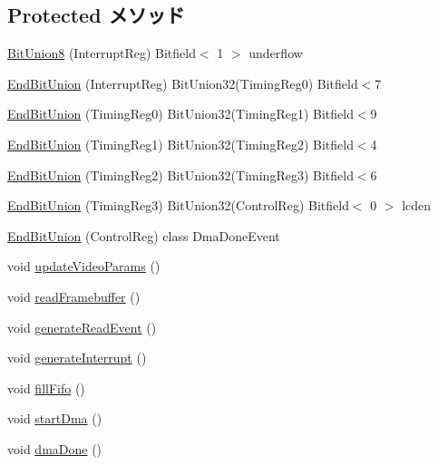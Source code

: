 \subsection*{Protected メソッド}
\begin{DoxyCompactItemize}
\item 
\hyperlink{classPl111_a6314622cb4d926c2f90ff68d0cbbf17c}{BitUnion8} (InterruptReg) Bitfield$<$ 1 $>$ underflow
\item 
\hyperlink{classPl111_a28c76606944b50cce3f43516e6178ea5}{EndBitUnion} (InterruptReg) BitUnion32(TimingReg0) Bitfield$<$7
\item 
\hyperlink{classPl111_ab87617f01d73eb885bbcaf6ae70a63ce}{EndBitUnion} (TimingReg0) BitUnion32(TimingReg1) Bitfield$<$9
\item 
\hyperlink{classPl111_a19b12e8bc5e6548d8e6b86ed682c16f6}{EndBitUnion} (TimingReg1) BitUnion32(TimingReg2) Bitfield$<$4
\item 
\hyperlink{classPl111_ae2c8da18642e08cf0a04bb5466b31d49}{EndBitUnion} (TimingReg2) BitUnion32(TimingReg3) Bitfield$<$6
\item 
\hyperlink{classPl111_abc7da5ed10e1372b64f2b4e6e8775fd8}{EndBitUnion} (TimingReg3) BitUnion32(ControlReg) Bitfield$<$ 0 $>$ lcden
\item 
\hyperlink{classPl111_a1a4be918f70fc01f16ec330702d1042a}{EndBitUnion} (ControlReg) class DmaDoneEvent
\item 
void \hyperlink{classPl111_a13d435a77cf1f2fa37400a9c98a3764a}{updateVideoParams} ()
\item 
void \hyperlink{classPl111_a104de82eb7e1fbd4c9180640f507a5f4}{readFramebuffer} ()
\item 
void \hyperlink{classPl111_ac97605847b61ff35749ab636c2cd1be0}{generateReadEvent} ()
\item 
void \hyperlink{classPl111_ab251ef5c4d9e1f0239542a9d8aa0dc3e}{generateInterrupt} ()
\item 
void \hyperlink{classPl111_ab3d994fdac5f0732cdd0a027db03df46}{fillFifo} ()
\item 
void \hyperlink{classPl111_a3c48da42be160d9646d69fad61037078}{startDma} ()
\item 
void \hyperlink{classPl111_a06cfa1e5151d07acbefac240127d471b}{dmaDone} ()
\end{DoxyCompactItemize}

